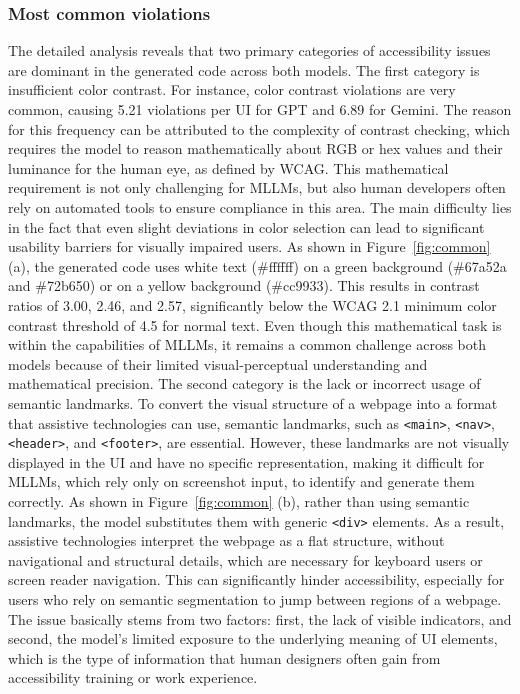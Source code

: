 \subsubsection{Most common violations}
The detailed analysis reveals that two primary categories of accessibility
issues are dominant in the generated code across both models.
The first category is insufficient color contrast. For instance,
color contrast violations are very common, causing 5.21 violations 
per UI for GPT and 6.89 for Gemini. The reason for this frequency 
can be attributed to the complexity of contrast checking, which 
requires the model to reason mathematically about RGB or hex values
and their luminance for the human eye, as defined by WCAG. This mathematical 
requirement is not only challenging for MLLMs, but also human 
developers often rely on automated tools to ensure compliance 
in this area. The main difficulty lies in the fact that 
even slight deviations in color selection can lead to significant 
usability barriers for visually impaired users. As shown in 
Figure~\ref{fig:common} (a), the generated code uses white text 
(\#ffffff) on a green background (\#67a52a and \#72b650)
or on a yellow background (\#cc9933). This results in 
contrast ratios of 3.00, 2.46, and 2.57, significantly below the
WCAG 2.1 minimum color contrast threshold of 4.5 for normal text.
Even though this mathematical task is within the capabilities of 
MLLMs, it remains a common challenge across both models because 
of their limited visual-perceptual understanding and mathematical 
precision.\newline
The second category is the lack or incorrect usage of semantic 
landmarks. To convert 
the visual structure of a webpage into a format that
assistive technologies can use, semantic landmarks, 
such as \texttt{<main>}, \texttt{<nav>},
\texttt{<header>}, and \texttt{<footer>}, are essential. 
However, these landmarks are not visually 
displayed in the UI and have no specific representation, making it 
difficult for MLLMs, which rely only on screenshot input,
to identify and generate them correctly. As 
shown in Figure~\ref{fig:common} (b), rather than using 
semantic landmarks, the model substitutes them with 
generic \texttt{<div>} elements. As a result, assistive technologies 
interpret the webpage as a flat structure, without navigational 
and structural details, which are necessary for keyboard users or 
screen reader navigation. This can significantly hinder 
accessibility, especially for users who rely on 
semantic segmentation to jump between regions of a webpage. 
The issue basically stems from two factors: first, the lack of 
visible indicators, and second, the model’s limited exposure to 
the underlying meaning of UI elements, which is the type of 
information that human designers often gain from accessibility training or work experience.



